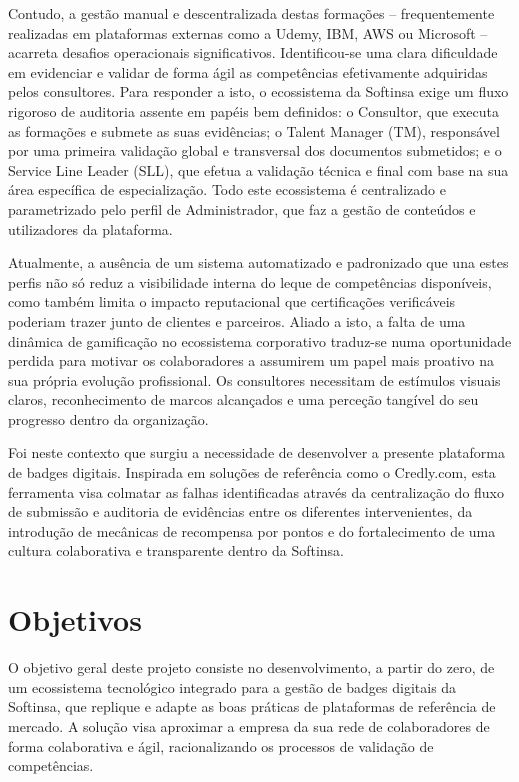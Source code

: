 \documentclass[12pt,a4paper]{report}
\begin{document}
Contudo, a gestão manual e descentralizada destas formações -- frequentemente realizadas em plataformas externas como a Udemy, IBM, AWS ou Microsoft -- acarreta desafios operacionais significativos. Identificou-se uma clara dificuldade em evidenciar e validar de forma ágil as competências efetivamente adquiridas pelos consultores. Para responder a isto, o ecossistema da Softinsa exige um fluxo rigoroso de auditoria assente em papéis bem definidos: o Consultor, que executa as formações e submete as suas evidências; o Talent Manager (TM), responsável por uma primeira validação global e transversal dos documentos submetidos; e o Service Line Leader (SLL), que efetua a validação técnica e final com base na sua área específica de especialização. Todo este ecossistema é centralizado e parametrizado pelo perfil de Administrador, que faz a gestão de conteúdos e utilizadores da plataforma.

Atualmente, a ausência de um sistema automatizado e padronizado que una estes perfis não só reduz a visibilidade interna do leque de competências disponíveis, como também limita o impacto reputacional que certificações verificáveis poderiam trazer junto de clientes e parceiros. Aliado a isto, a falta de uma dinâmica de gamificação no ecossistema corporativo traduz-se numa oportunidade perdida para motivar os colaboradores a assumirem um papel mais proativo na sua própria evolução profissional. Os consultores necessitam de estímulos visuais claros, reconhecimento de marcos alcançados e uma perceção tangível do seu progresso dentro da organização.

Foi neste contexto que surgiu a necessidade de desenvolver a presente plataforma de badges digitais. Inspirada em soluções de referência como o Credly.com, esta ferramenta visa colmatar as falhas identificadas através da centralização do fluxo de submissão e auditoria de evidências entre os diferentes intervenientes, da introdução de mecânicas de recompensa por pontos e do fortalecimento de uma cultura colaborativa e transparente dentro da Softinsa.

\section{Objetivos}

O objetivo geral deste projeto consiste no desenvolvimento, a partir do zero, de um ecossistema tecnológico integrado para a gestão de badges digitais da Softinsa, que replique e adapte as boas práticas de plataformas de referência de mercado. A solução visa aproximar a empresa da sua rede de colaboradores de forma colaborativa e ágil, racionalizando os processos de validação de competências.
\end{document}
